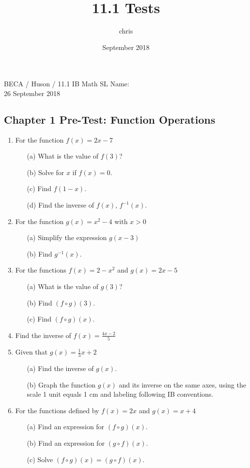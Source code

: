 \documentclass{article}
\title{11.1 Tests}
\author{chris }
\date{September 2018}
\begin{document}
\noindent BECA / Huson / 11.1 IB Math SL \qquad \qquad Name:\\
26 September 2018
\subsection*{Chapter 1 Pre-Test: Function Operations}

\begin{enumerate}

\item For the function $f(x) = 2x-7$
    \begin{itemize}
        \item[(a)] What is the value of $f(3)$?
        \item[(b)] Solve for $x$ if $f(x)=0$.
        \item[(c)] Find  $f(1-x)$.
        \item[(d)] Find the inverse of $f(x)$,  $f^{-1}(x)$.
    \end{itemize}

\item For the function $g(x) = x^2-4$ with $x>0$
\begin{itemize}
    \item[(a)] Simplify the expression $g(x-3)$
	\item[(b)] Find  $g^{-1}(x)$.
\end{itemize}

\item For the functions $f(x) = 2-x^2$ and $g(x) = 2x-5$
\begin{itemize}
    \item[(a)] What is the value of $g(3)$?
	\item[(b)] Find $(f\circ g)(3)$.
	\item[(c)] Find $(f\circ g)(x)$.
\end{itemize}

\item Find the inverse of $\displaystyle f(x)= \frac {4x-2}{5}$

\item Given that $g(x) = \frac {1}{3} x+2$
\begin{itemize}
    \item[(a)] Find the inverse of $g(x)$.
	\item[(b)] Graph the function $g(x)$ and its inverse on the same axes, using the scale 1 unit equals 1 cm and labeling following IB conventions.
\end{itemize}

\item For the functions defined by $f(x) = 2x$ and $g(x) = x+4$
\begin{itemize}
    \item[(a)] Find an expression for $(f\circ g)(x)$.
	\item[(b)] Find an expression for $(g\circ f)(x)$.
	\item[(c)] Solve $(f\circ g)(x)=(g\circ f)(x)$.
\end{itemize}


\end{enumerate}
\end{document}
